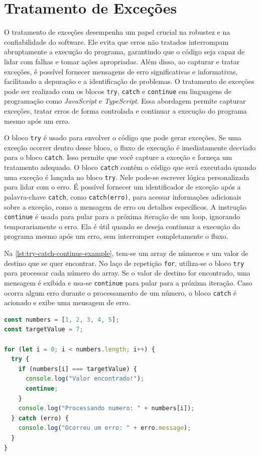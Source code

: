 \section{Tratamento de Exceções}
\label{JS_tratamentoExcecoes}

O tratamento de exceções desempenha um papel crucial na robustez e na confiabilidade do software. Ele evita que erros não tratados interrompam abruptamente a execução do programa, garantindo que o código seja capaz de lidar com falhas e tomar ações apropriadas. Além disso, ao capturar e tratar exceções, é possível fornecer mensagens de erro significativas e informativas, facilitando a depuração e a identificação de problemas. O tratamento de exceções pode ser realizado com os blocos \texttt{try}, \texttt{catch} e \texttt{continue} em linguagens de programação como \textit{JavaScript} e \textit{TypeScript}. Essa abordagem permite capturar exceções, tratar erros de forma controlada e continuar a execução do programa mesmo após um erro. 

O bloco \texttt{try} é usado para envolver o código que pode gerar exceções. Se uma exceção ocorrer dentro desse bloco, o fluxo de execução é imediatamente desviado para o bloco \texttt{catch}. Isso permite que você capture a exceção e forneça um tratamento adequado. O bloco \texttt{catch} contém o código que será executado quando uma exceção é lançada no bloco \texttt{try}. Nele pode-se escrever lógica personalizada para lidar com o erro. É possível fornecer um identificador de exceção após a palavra-chave \texttt{catch}, como \texttt{catch(erro)}, para acessar informações adicionais sobre a exceção, como a mensagem de erro ou detalhes específicos. A instrução \texttt{continue} é usada para pular para a próxima iteração de um loop, ignorando temporariamente o erro. Ela é útil quando se deseja continuar a execução do programa mesmo após um erro, sem interromper completamente o fluxo.


Na \autoref{lst:try-catch-continue-example}, tem-se um array de números e um valor de destino que se quer encontrar. No laço de repetição \texttt{for}, utiliza-se o bloco \texttt{try} para processar cada número do array. Se o valor de destino for encontrado, uma mensagem é exibida e usa-se \texttt{continue} para pular para a próxima iteração. Caso ocorra algum erro durante o processamento de um número, o bloco \texttt{catch} é acionado e exibe uma mensagem de erro.




\begin{lstlisting}[language=TypeScript, caption={Exemplo de uso de \texttt{try}, \texttt{catch} e \texttt{continue}} em JS e TS, label=lst:try-catch-continue-example]
const numbers = [1, 2, 3, 4, 5];
const targetValue = 7;

for (let i = 0; i < numbers.length; i++) {
  try {
    if (numbers[i] === targetValue) {
      console.log("Valor encontrado!");
      continue;
    }
    console.log("Processando numero: " + numbers[i]);
  } catch (erro) {
    console.log("Ocorreu um erro: " + erro.message);
  }
}
\end{lstlisting}

